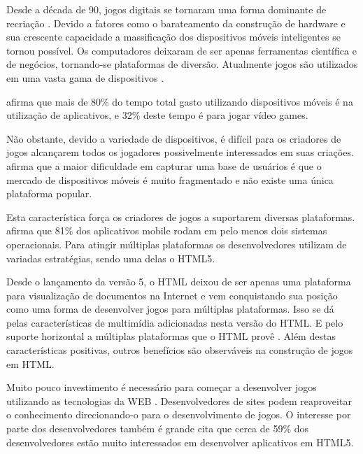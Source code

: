 
Desde a década de 90, jogos digitais se tornaram uma forma dominante
de recriação \autocite{gameDesignPatterns}. Devido a fatores como o
barateamento da construção de hardware e sua crescente capacidade a massificação
dos dispositivos móveis inteligentes se tornou possível. Os
computadores deixaram de ser apenas ferramentas científica e de
negócios, tornando-se plataformas de diversão. Atualmente jogos
são utilizados em uma vasta gama de dispositivos \autocite[p.
6]{crossPlatformMobileGameDevelopment}.

\citet{HTML5CrossPlatformGameDevelopment} afirma que mais de 80\% do
tempo total gasto utilizando dispositivos móveis é na utilização de
aplicativos, e 32\% deste tempo é para jogar vídeo games.

Não obstante, devido a variedade de dispositivos, é difícil para
os criadores de jogos alcançarem todos os jogadores possivelmente
interessados em suas criações. \citet{html5Tradeoffs} afirma que a
maior dificuldade em capturar uma base de usuários é que o mercado
de dispositivos móveis é muito fragmentado e não existe uma única
plataforma popular.

Esta característica força os criadores de jogos a suportarem diversas
plataformas. \autocite{htmlSurvey} afirma que 81\% dos aplicativos
mobile rodam em pelo menos dois sistemas operacionais. Para atingir
múltiplas plataformas os desenvolvedores utilizam de variadas
estratégias, sendo uma delas o HTML5.

Desde o lançamento da versão 5, o HTML deixou de ser apenas uma
plataforma para visualização de documentos na Internet e vem
conquistando sua posição como uma forma de desenvolver jogos
para múltiplas plataformas. Isso se dá pelas características de
multimídia adicionadas nesta versão do HTML. E pelo suporte horizontal
a múltiplas plataformas que o HTML provê \autocite{html5Tradeoffs}.
Além destas características positivas, outros benefícios são
observáveis na construção de jogos em HTML.

Muito pouco investimento é necessário para começar a desenvolver
jogos utilizando as tecnologias da WEB \autocite{html5mostwanted}.
Desenvolvedores de sites podem reaproveitar o conhecimento direcionando-o
para o desenvolvimento de jogos. O interesse por parte dos
desenvolvedores também é grande \autocite{htmlSurvey} cita que cerca
de 59\% dos desenvolvedores estão muito interessados em desenvolver
aplicativos em HTML5.

